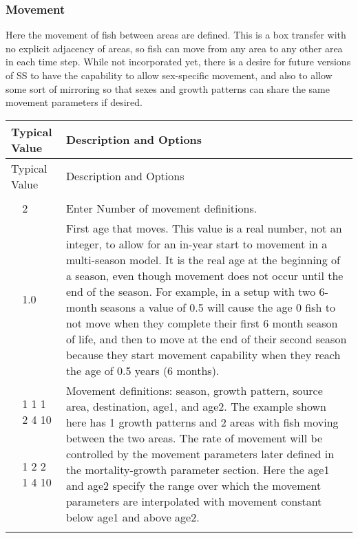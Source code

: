 \subsubsection{Movement}
Here the movement of fish between areas are defined.  This is a box transfer with no explicit adjacency of areas, so fish can move from any area to any other area in each time step. While not incorporated yet, there is a desire for future versions of SS to have the capability to allow sex-specific movement, and also to allow some sort of mirroring so that sexes and growth patterns can share the same movement parameters if desired.

\begin{longtable}{p{0.5cm} p{2cm} p{12cm}}
	\hline
	\multicolumn{2}{l}{Typical Value} & Description and Options\Tstrut\Bstrut\\
	\hline
	\endfirsthead

	\hline
	\multicolumn{2}{l}{Typical Value} & Description and Options\Tstrut\Bstrut\\
	\hline
	\endhead

	\hline
	\endfoot

	\endlastfoot
	
	\multicolumn{3}{l}{COND:  only if areas > 1}\Tstrut\\ 
	& 2   & Enter Number of movement definitions.\Tstrut\\		
	\Tstrut & 1.0  & First age that moves. This value is a real number, not an integer, to allow for an in-year start to movement in a multi-season model.  It is the real age at the beginning of a season, even though movement does not occur until the end of the season. For example, in a  setup with two 6-month seasons a value of 0.5 will cause the age 0 fish to not move when they complete their first 6 month season of life, and then to move at the end of their second season because they start movement capability when they reach the age of 0.5 years (6 months). \\
	\pagebreak
	\Tstrut & 1 1 1 2 4 10 & \multicolumn{1}{l}{\multirow{5}{6cm}{\parbox{12cm}{Movement definitions: season, growth pattern, source area, destination, age1, and age2. The example shown here has 1 growth patterns and 2 areas with fish moving between the two areas. The rate of movement will be controlled by the movement parameters later defined in the mortality-growth parameter section.  Here the age1 and age2 specify the range over which the movement parameters are interpolated with movement constant below age1 and above age2.}}}\\
	& 1 2 2 1 4 10 &  \Bstrut\\
	\\
	\\
	\\
	\\ 
	\hline
	\end{longtable}

